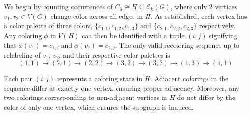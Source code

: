 \documentclass[12pt,reqno,dvipsnames]{amsart}
\theoremstyle{definition}
\begin{document}
We begin by counting occurrences of $C_6\cong H\subseteq \mathcal{C}_k(G)$, where only 2 vertices $v_1,v_2\in V(G)$ change color across all edges in $H$. As established, each vertex has a color palette of three colors, $\{c_{1,1},c_{1,2},c_{1,3}\}$ and $\{c_{2,1},c_{2,2},c_{2,3}\}$ respectively. Any coloring $\phi$ in $V(H)$ can then be identified with a tuple $(i,j)$ signifying that $\phi(v_1)=c_{1,i}$ and $\phi(v_2)=c_{2,j}$. The only valid recoloring sequence up to relabeling of $v_1$, $v_2$, and their respective color palettes is
$$
(1,1)\to (2,1)\to(2,2)\to(3,2)\to(3,3)\to(1,3)\to(1,1)
$$

Each pair $(i,j)$ represents a coloring state in $H$. Adjacent colorings in the sequence differ at exactly one vertex, ensuring proper adjacency. Moreover, any two colorings corresponding to non-adjacent vertices in $H$ do not differ by the color of only one vertex, which ensures the subgraph is induced.
\end{document}
